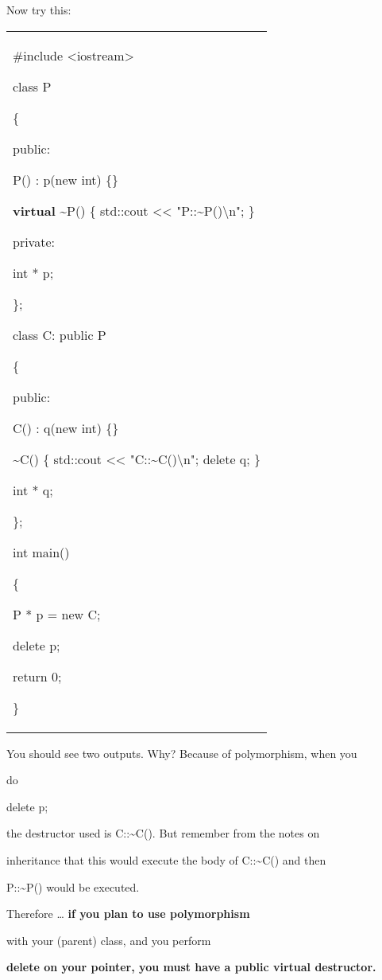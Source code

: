 \documentclass[
]{article}
\begin{document}
Now try this:

\begin{longtable}[]{@{}
  >{\raggedright\arraybackslash}p{}@{}}
\toprule\noalign{}
 \\
\midrule\noalign{}
\endhead
\bottomrule\noalign{}
\endlastfoot
\#include \textless iostream\textgreater{}

class P

\{

public:

P() : p(new int) \{\}

\textbf{ virtual }\textasciitilde P() \{ std::cout \textless\textless{}
"P::\textasciitilde P()\textbackslash n"; \}

private:

int * p;

\};

class C: public P

\{

public:

C() : q(new int) \{\}

\textasciitilde C() \{ std::cout \textless\textless{}
"C::\textasciitilde C()\textbackslash n"; delete q; \}

int * q;

\};

int main()

\{

P * p = new C;

delete p;

return 0;

\} \\
\end{longtable}

You should see two outputs. Why? Because of polymorphism, when you

do

delete p;

the destructor used is C::\textasciitilde C(). But remember from the
notes on

inheritance that this would execute the body of C::\textasciitilde C()
and then

P::\textasciitilde P() would be executed.

Therefore \ldots{} \textbf{if you plan to use polymorphism}

with your (parent) class, and you perform

\textbf{delete on your pointer, you must have a public virtual
destructor.}
\end{document}
